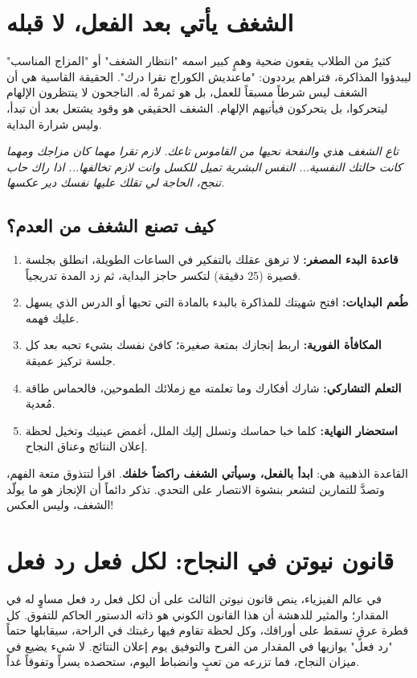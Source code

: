 \documentclass[12pt,a4paper]{book}
\newcommand{\quoteAr}[1]{%
	\begin{myquote}
		\itshape #1
	\end{myquote}
}
\begin{document}
	\section{الشغف يأتي بعد الفعل، لا قبله}
	
	كثيرٌ من الطلاب يقعون ضحية وهمٍ كبير اسمه "انتظار الشغف" أو "المزاج المناسب" ليبدؤوا المذاكرة، فتراهم يرددون: "ماعنديش الكوراج نقرا درك". الحقيقة القاسية هي أن الشغف ليس شرطاً مسبقاً للعمل، بل هو ثمرةٌ له. الناجحون لا ينتظرون الإلهام ليتحركوا، بل يتحركون فيأتيهم الإلهام. الشغف الحقيقي هو وقود يشتعل بعد أن تبدأ، وليس شرارة البداية.
	
	\quoteAr{تاع الشغف هذي والنفحة نحيها من القاموس تاعك. لازم تقرا مهما كان مزاجك ومهما كانت حالتك النفسية... النفس البشرية تميل للكسل وانت لازم تخالفها... اذا راك حاب تنجح، الحاجة لي تقلك عليها نفسك دير عكسها.}
	
	\subsection*{كيف تصنع الشغف من العدم؟}
	\begin{enumerate}
		\item \textbf{قاعدة البدء المصغر:} لا ترهق عقلك بالتفكير في الساعات الطويلة، انطلق بجلسة قصيرة (25 دقيقة) لتكسر حاجز البداية، ثم زد المدة تدريجياً.
		\item \textbf{طُعم البدايات:} افتح شهيتك للمذاكرة بالبدء بالمادة التي تحبها أو الدرس الذي يسهل عليك فهمه.
		\item \textbf{المكافأة الفورية:} اربط إنجازك بمتعة صغيرة؛ كافئ نفسك بشيء تحبه بعد كل جلسة تركيز عميقة.
		\item \textbf{التعلم التشاركي:} شارك أفكارك وما تعلمته مع زملائك الطموحين، فالحماس طاقة مُعدية.
		\item \textbf{استحضار النهاية:} كلما خبا حماسك وتسلل إليك الملل، أغمض عينيك وتخيل لحظة إعلان النتائج وعناق النجاح.
	\end{enumerate}
	
	القاعدة الذهبية هي: \textbf{ابدأ بالفعل، وسيأتي الشغف راكضاً خلفك}. اقرأ لتتذوق متعة الفهم، وتصدَّ للتمارين لتشعر بنشوة الانتصار على التحدي. تذكر دائماً أن الإنجاز هو ما يولّد الشغف، وليس العكس!
	\section{قانون نيوتن في النجاح: لكل فعل رد فعل}
	
	في عالم الفيزياء، ينص قانون نيوتن الثالث على أن لكل فعل رد فعل مساوٍ له في المقدار؛ والمثير للدهشة أن هذا القانون الكوني هو ذاته الدستور الحاكم للتفوق. كل قطرة عرقٍ تسقط على أوراقك، وكل لحظة تقاوم فيها رغبتك في الراحة، سيقابلها حتماً "رد فعل" يوازيها في المقدار من الفرح والتوفيق يوم إعلان النتائج. لا شيء يضيع في ميزان النجاح، فما تزرعه من تعبٍ وانضباط اليوم، ستحصده يسراً وتفوقاً غداً.
	
\end{document}
